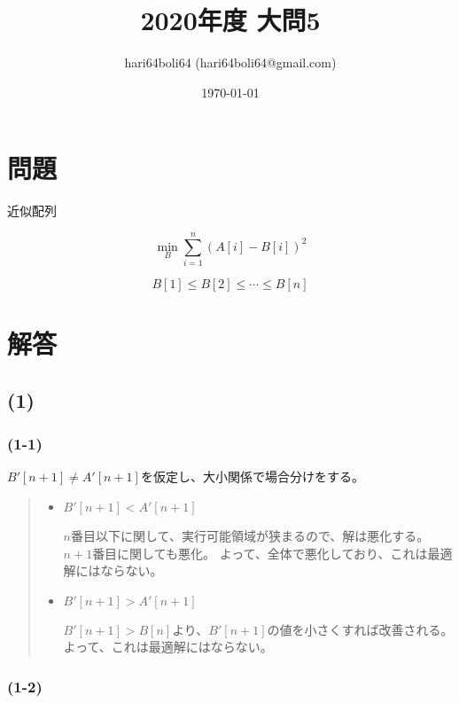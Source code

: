 \documentclass[a4paper, 10pt, dvipdfmx]{jlreq}
\begin{document}
\title{2020年度 大問5}
\author{hari64boli64 (hari64boli64@gmail.com)}
\date{\today}
\maketitle


\section{問題}

近似配列

\begin{equation*}
  \min_{B} \sum_{i=1}^{n}{(A[i]-B[i])^2}
\end{equation*}

$$
  B[1]\leq B[2] \leq \cdots \leq B[n]
$$

\section{解答}

\subsection*{(1)}

\subsubsection*{(1-1)}

$B'[n+1] \neq A'[n+1]$を仮定し、大小関係で場合分けをする。

\begin{quote}
  \begin{itemize}
    \item  $B'[n+1] < A'[n+1]$

          $n$番目以下に関して、実行可能領域が狭まるので、解は悪化する。
          $n+1$番目に関しても悪化。
          よって、全体で悪化しており、これは最適解にはならない。

    \item  $B'[n+1] > A'[n+1]$

          $B'[n+1]>B[n]$より、$B'[n+1]$の値を小さくすれば改善される。
          よって、これは最適解にはならない。
  \end{itemize}
\end{quote}


\subsubsection*{(1-2)}
\end{document}
